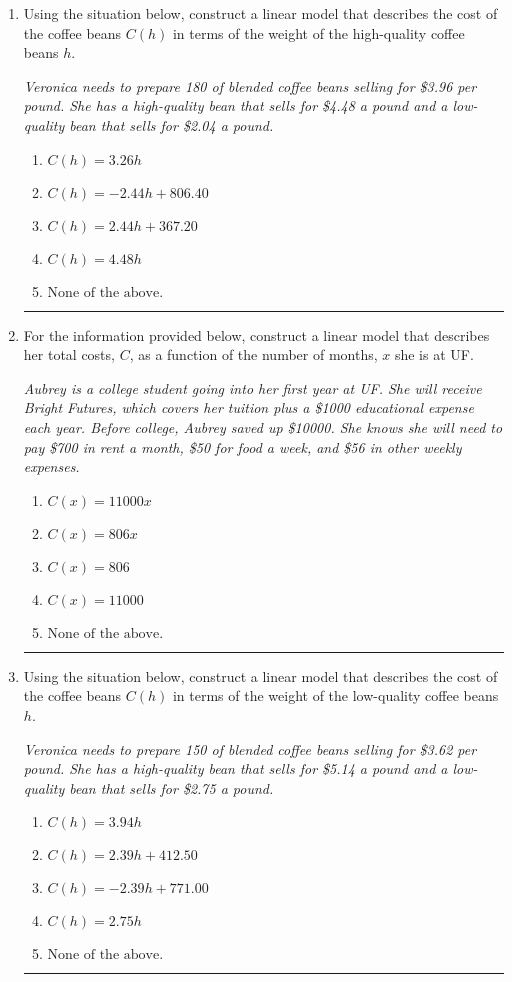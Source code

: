 \documentclass[14pt]{extbook}
\newcommand{\litem}[1]{\item#1\hspace*{-1cm}\rule{\textwidth}{0.4pt}}
\begin{document}
\begin{enumerate}
{\begin{enumerate}[label=\Alph*.]
\end{enumerate} }
\litem{
Using the situation below, construct a linear model that describes the cost of the coffee beans $C(h)$ in terms of the weight of the high-quality coffee beans $h$.
\begin{center}
    \textit{ Veronica needs to prepare 180 of blended coffee beans selling for \$3.96 per pound. She has a high-quality bean that sells for \$4.48 a pound and a low-quality bean that sells for \$2.04 a pound. }
\end{center}
\begin{enumerate}[label=\Alph*.]
\item \( C(h) = 3.26 h \)
\item \( C(h) = -2.44 h + 806.40 \)
\item \( C(h) = 2.44 h + 367.20 \)
\item \( C(h) = 4.48 h \)
\item \( \text{None of the above.} \)

\end{enumerate} }
\litem{
For the information provided below, construct a linear model that describes her total costs, $C$, as a function of the number of months, $x$ she is at UF. 
\begin{center}
    \textit{ Aubrey is a college student going into her first year at UF. She will receive Bright Futures, which covers her tuition plus a \$1000 educational expense each year. Before college, Aubrey saved up \$10000. She knows she will need to pay \$700 in rent a month, \$50 for food a week, and \$56 in other weekly expenses. }
\end{center}
\begin{enumerate}[label=\Alph*.]
\item \( C(x) = 11000 x \)
\item \( C(x) = 806 x \)
\item \( C(x) = 806 \)
\item \( C(x) = 11000 \)
\item \( \text{None of the above.} \)

\end{enumerate} }
\litem{
Using the situation below, construct a linear model that describes the cost of the coffee beans $C(h)$ in terms of the weight of the low-quality coffee beans $h$.
\begin{center}
    \textit{ Veronica needs to prepare 150 of blended coffee beans selling for \$3.62 per pound. She has a high-quality bean that sells for \$5.14 a pound and a low-quality bean that sells for \$2.75 a pound. }
\end{center}
\begin{enumerate}[label=\Alph*.]
\item \( C(h) = 3.94 h \)
\item \( C(h) = 2.39 h + 412.50 \)
\item \( C(h) = -2.39 h + 771.00 \)
\item \( C(h) = 2.75 h \)
\item \( \text{None of the above.} \)


\end{enumerate}}
\end{enumerate}
\end{document}
